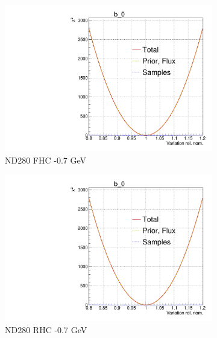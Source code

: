 \begin{figure}[h]
	\begin{subfigure}[t]{0.32\textwidth}
		\includegraphics[width=\textwidth, trim={0mm 0mm 0mm 11mm}, clip,page=18]{figures/mach3/2018/llh/tryBinningNumber6_after_fit_asimov_asimov_ND280logL_scan}
		\caption{ND280 FHC -0.7 GeV}
	\end{subfigure}
	\begin{subfigure}[t]{0.32\textwidth}
		\includegraphics[width=\textwidth, trim={0mm 0mm 0mm 11mm}, clip,page=45]{figures/mach3/2018/llh/tryBinningNumber6_after_fit_asimov_asimov_ND280logL_scan}
		\caption{ND280 RHC -0.7 GeV}
	\end{subfigure}
	\begin{subfigure}[t]{0.32\textwidth}

\end{subfigure}
\end{figure}
